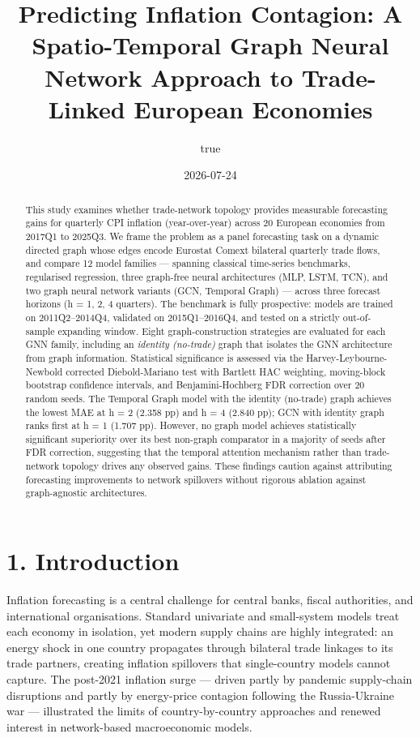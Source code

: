 \documentclass[
  11pt,
  a4paper]{article}
\title{Predicting Inflation Contagion: A Spatio-Temporal Graph Neural
Network Approach to Trade-Linked European Economies}
\author{true}
\date{2026-07-24}
\begin{document}
\maketitle
\begin{abstract}
This study examines whether trade-network topology provides measurable
forecasting gains for quarterly CPI inflation (year-over-year) across 20
European economies from 2017Q1 to 2025Q3. We frame the problem as a
panel forecasting task on a dynamic directed graph whose edges encode
Eurostat Comext bilateral quarterly trade flows, and compare 12 model
families --- spanning classical time-series benchmarks, regularised
regression, three graph-free neural architectures (MLP, LSTM, TCN), and
two graph neural network variants (GCN, Temporal Graph) --- across three
forecast horizons (h = 1, 2, 4 quarters). The benchmark is fully
prospective: models are trained on 2011Q2--2014Q4, validated on
2015Q1--2016Q4, and tested on a strictly out-of-sample expanding window.
Eight graph-construction strategies are evaluated for each GNN family,
including an \emph{identity (no-trade)} graph that isolates the GNN
architecture from graph information. Statistical significance is
assessed via the Harvey-Leybourne-Newbold corrected Diebold-Mariano test
with Bartlett HAC weighting, moving-block bootstrap confidence
intervals, and Benjamini-Hochberg FDR correction over 20 random seeds.
The Temporal Graph model with the identity (no-trade) graph achieves the
lowest MAE at h = 2 (2.358 pp) and h = 4 (2.840 pp); GCN with identity
graph ranks first at h = 1 (1.707 pp). However, no graph model achieves
statistically significant superiority over its best non-graph comparator
in a majority of seeds after FDR correction, suggesting that the
temporal attention mechanism rather than trade-network topology drives
any observed gains. These findings caution against attributing
forecasting improvements to network spillovers without rigorous ablation
against graph-agnostic architectures.
\end{abstract}

\section{1. Introduction}\label{introduction}

Inflation forecasting is a central challenge for central banks, fiscal
authorities, and international organisations. Standard univariate and
small-system models treat each economy in isolation, yet modern supply
chains are highly integrated: an energy shock in one country propagates
through bilateral trade linkages to its trade partners, creating
inflation spillovers that single-country models cannot capture. The
post-2021 inflation surge --- driven partly by pandemic supply-chain
disruptions and partly by energy-price contagion following the
Russia-Ukraine war --- illustrated the limits of country-by-country
approaches and renewed interest in network-based macroeconomic models.
\end{document}
